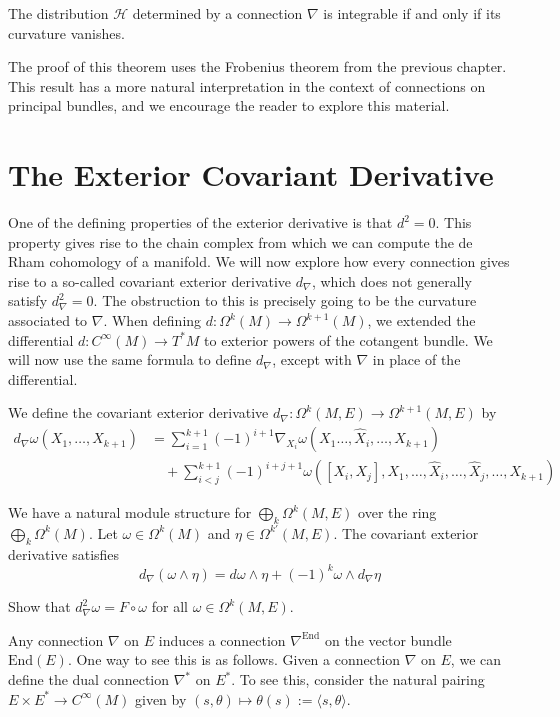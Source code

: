 \begin{theorem}
  The distribution $\mathcal{H}$ determined by a connection $\nabla$ is integrable if and only if its curvature vanishes.
\end{theorem}
The proof of this theorem uses the Frobenius theorem from the previous chapter. This result has a more natural interpretation in the context of connections on principal bundles, and we encourage the reader to explore this material.

\section{The Exterior Covariant Derivative}

One of the defining properties of the exterior derivative is that $d^2=0$. This property gives rise to the chain complex from which we can compute the de Rham cohomology of a manifold. We will now explore how every connection gives rise to a so-called covariant exterior derivative $d_\nabla$, which does not generally satisfy $d_\nabla^2=0$. The obstruction to this is precisely going to be the curvature associated to $\nabla$. When defining $d:\Omega^k(M)\to\Omega^{k+1}(M)$, we extended the differential $d:C^\infty(M)\to T^*M$ to exterior powers of the cotangent bundle. We will now use the same formula to define $d_\nabla$, except with $\nabla$ in place of the differential.
\begin{definition}
  We define the covariant exterior derivative $d_\nabla:\Omega^k(M,E)\to\Omega^{k+1}(M,E)$ by
  \begin{align*}
    d_\nabla\omega(X_1,\dots,X_{k+1}) &= \sum^{k+1}_{i=1}(-1)^{i+1}\nabla_{X_i}\omega(X_1\dots,\widehat{X}_i,\dots,X_{k+1})\\
                                      &\quad +\sum_{i<j}^{k+1}(-1)^{i+j+1}\omega([X_i,X_j],X_1,\dots,\widehat{X}_i,\dots,\widehat{X}_j,\dots,X_{k+1})
  \end{align*}
\end{definition}
We have a natural module structure for $\bigoplus_k\Omega^k(M,E)$ over the ring $\bigoplus_k\Omega^k(M)$. Let $\omega\in\Omega^k(M)$ and $\eta\in\Omega^{k'}(M,E)$. The covariant exterior derivative satisfies
$$d_\nabla(\omega\wedge\eta)=d\omega\wedge\eta+(-1)^k\omega\wedge d_\nabla\eta$$
\begin{exercise}
  Show that $d_\nabla^2\omega=F\circ\omega$ for all $\omega\in\Omega^k(M,E)$.
\end{exercise}
Any connection $\nabla$ on $E$ induces a connection $\nabla^\text{End}$ on the vector bundle $\text{End}(E)$. One way to see this is as follows. Given a connection $\nabla$ on $E$, we can define the dual connection $\nabla^*$ on $E^*$. To see this, consider the natural pairing $E\times E^*\to C^\infty(M)$ given by $(s,\theta)\mapsto\theta(s):=\langle s,\theta\rangle$.
